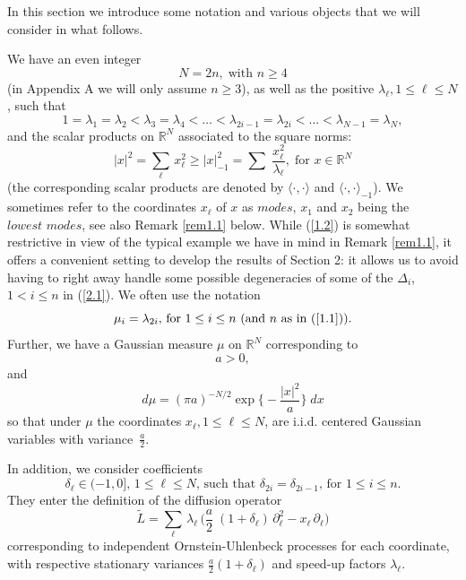 \documentclass[12pt,leqno]{article}
\def\IR{{\mathbb R}}
\def\dis{\displaystyle}
\def\wt{\widetilde}
\begin{document}
In this section we introduce some notation and various objects that we will consider in what follows.

\medskip
We have an even integer
\begin{equation}\label{1.1}
N = 2 n, \; \mbox{with $n \ge 4$}
\end{equation}
(in Appendix A we will only assume $n \ge 3$), as well as the positive $\lambda_\ell, 1 \le \ell \le N$, such that
\begin{equation}\label{1.2}
1 = \lambda_1 = \lambda_2 < \lambda_3 = \lambda_4 < \dots < \lambda_{2 i -1} = \lambda_{2i} < \dots < \lambda_{N-1} = \lambda_N,
\end{equation}
and the scalar products on $\IR^N$ associated to the square norms:
\begin{equation}\label{1.3}
|x|^2 = \sum_\ell \, x_\ell^2  \ge |x|^2_{-1} = \sum \; \dis\frac{x^2_\ell}{\lambda_\ell}, \; \mbox{for $x \in \IR^N$}
\end{equation}
(the corresponding scalar products are denoted by $\langle \cdot, \cdot \rangle$ and $\langle \cdot, \cdot\rangle_{-1}$). We sometimes refer to the coordinates $x_\ell$ of $x$ as $\textit{modes}$, $x_1$ and $x_2$ being the $\textit{lowest modes}$, see also Remark \ref{rem1.1} below.  While (\ref{1.2}) is somewhat restrictive in view of the typical example we have in mind in Remark \ref{rem1.1}, it offers a convenient setting to develop the results of Section 2: it allows us to avoid having to right away handle some possible degeneracies of some of the $\Delta_i$, $1 < i \le n$ in (\ref{2.1}). We often use the notation
\begin{equation}\label{1.4}
\mbox{$\mu_i = \lambda_{2i}$, for $1 \le i \le n$ (and $n$ as in (\ref{1.1}))}.
\end{equation}
Further, we have a Gaussian measure $\mu$ on $\IR^N$ corresponding to
\begin{equation}\label{1.5}
a > 0,
\end{equation}
and 
\begin{equation}\label{1.6}
d \mu = (\pi a)^{-N/2} \exp \big\{-\dis\frac{|x|^2}{a} \big\} \;dx
\end{equation}
so that under $\mu$ the coordinates $x_\ell, 1 \le \ell \le N$, are i.i.d. centered Gaussian variables with variance~$\frac{a}{2}$.

\medskip
In addition, we consider coefficients
\begin{equation}\label{1.7}
\mbox{$\delta_\ell \in (-1, 0]$, $1 \le \ell \le N$, such that $\delta_{2i} = \delta_{2i-1}$, for $1 \le i \le n$}.
\end{equation}
They enter the definition of the diffusion operator
\begin{equation}\label{1.8}
\wt{L} = \sum_\ell \, \lambda_\ell \,\Big(\frac{a}{2} \;(1 + \delta_\ell) \, \partial^2_\ell - x_\ell \, \partial_\ell\Big)
\end{equation}
corresponding to independent Ornstein-Uhlenbeck processes for each coordinate, with respective stationary variances $\frac{a}{2} (1 + \delta_\ell)$ and speed-up factors $\lambda_\ell$.
\end{document}
